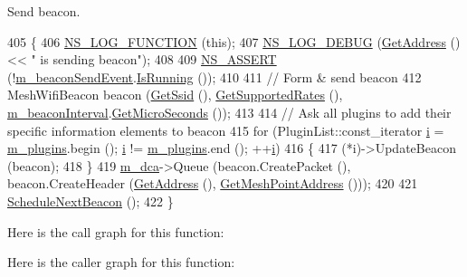 Send beacon. 


\begin{DoxyCode}
405 \{
406   \hyperlink{log-macros-disabled_8h_a90b90d5bad1f39cb1b64923ea94c0761}{NS\_LOG\_FUNCTION} (\textcolor{keyword}{this});
407   \hyperlink{group__logging_ga413f1886406d49f59a6a0a89b77b4d0a}{NS\_LOG\_DEBUG} (\hyperlink{classns3_1_1RegularWifiMac_aea719a7d05fbc664c50479fc900777b7}{GetAddress} () << \textcolor{stringliteral}{" is sending beacon"});
408 
409   \hyperlink{assert_8h_a6dccdb0de9b252f60088ce281c49d052}{NS\_ASSERT} (!\hyperlink{classns3_1_1MeshWifiInterfaceMac_a631ce3de769470f4f3e4bf92a95c54ba}{m\_beaconSendEvent}.\hyperlink{classns3_1_1EventId_aabf8476d1a080c199ea0c6aa9ccea372}{IsRunning} ());
410 
411   \textcolor{comment}{// Form & send beacon}
412   MeshWifiBeacon beacon (\hyperlink{classns3_1_1RegularWifiMac_a3cd4316ccd72111fa94f7091d4deb521}{GetSsid} (), \hyperlink{classns3_1_1MeshWifiInterfaceMac_a37557f1d320a7e81777212f4bad16839}{GetSupportedRates} (), 
      \hyperlink{classns3_1_1MeshWifiInterfaceMac_a106e67903abbdb360b51ce457b6d315b}{m\_beaconInterval}.\hyperlink{classns3_1_1Time_a2542b9273c336da11fcaf54e8bc6e4c8}{GetMicroSeconds} ());
413 
414   \textcolor{comment}{// Ask all plugins to add their specific information elements to beacon}
415   \textcolor{keywordflow}{for} (PluginList::const\_iterator \hyperlink{bernuolliDistribution_8m_a6f6ccfcf58b31cb6412107d9d5281426}{i} = \hyperlink{classns3_1_1MeshWifiInterfaceMac_ace0a54623c4daa3e9fc7f5570a84683c}{m\_plugins}.begin (); \hyperlink{bernuolliDistribution_8m_a6f6ccfcf58b31cb6412107d9d5281426}{i} != 
      \hyperlink{classns3_1_1MeshWifiInterfaceMac_ace0a54623c4daa3e9fc7f5570a84683c}{m\_plugins}.end (); ++\hyperlink{bernuolliDistribution_8m_a6f6ccfcf58b31cb6412107d9d5281426}{i})
416     \{
417       (*i)->UpdateBeacon (beacon);
418     \}
419   \hyperlink{classns3_1_1RegularWifiMac_a152965c3def1a308b088b37c2c88a1a2}{m\_dca}->Queue (beacon.CreatePacket (), beacon.CreateHeader (\hyperlink{classns3_1_1RegularWifiMac_aea719a7d05fbc664c50479fc900777b7}{GetAddress} (), 
      \hyperlink{classns3_1_1MeshWifiInterfaceMac_ae1a3d3670cdc5be340e749b19d51da7b}{GetMeshPointAddress} ()));
420 
421   \hyperlink{classns3_1_1MeshWifiInterfaceMac_a6de0d9fe72ccce3b29e4870a6abccc11}{ScheduleNextBeacon} ();
422 \}
\end{DoxyCode}


Here is the call graph for this function\+:




Here is the caller graph for this function\+:


